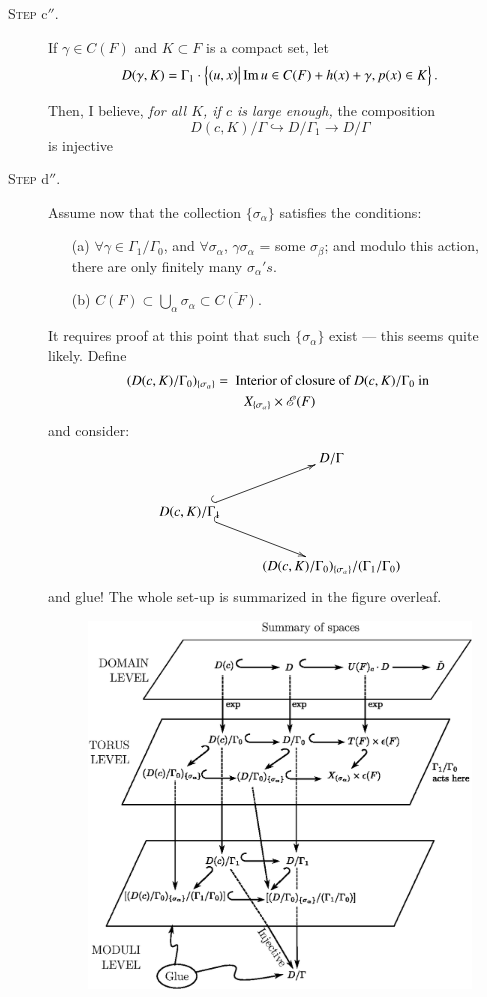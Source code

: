\begin{description}
\item[\textsc{Step} c$''$.] If $\gamma \in C(F)$ and $K \subset F$ is a compact set, let
$$
D (\gamma, K) = \Gamma_1 \cdot \left\{ (u, x) \big| \operatorname{Im}  u \in C (F) + h(x) + \gamma, p(x) \in K\right\}.
$$

Then, I believe, \textit{ for all $K$, if $c$ is large enough, } the composition
$$
D(c,K) / \Gamma \hookrightarrow D / \Gamma_1 \to D / \Gamma
$$ 
is injective

\item[\textsc{Step} d$''$.] Assume now that the collection $\{\sigma_\alpha\}$ satisfies the conditions:
\begin{itemize}
\item[(a)] $\forall \gamma \in \Gamma_1 / \Gamma_0$, and $\forall \sigma_\alpha$, $\gamma \sigma_\alpha$ = some $\sigma_\beta$; and modulo this action, there are only finitely many $\sigma_\alpha's$.

\item[(b)] $C(F) \subset \bigcup\limits_\alpha \sigma_\alpha \subset \overline{C(F)}$.
\end{itemize}

It requires proof at this point that such $\{\sigma_\alpha\}$ exist --- this seems quite likely. Define
\begin{gather*}
(D(c, K)/\Gamma_0)_{\{\sigma_\alpha\}} = \text{ Interior of closure of } D (c, K)/ \Gamma_0 \text{ in }\\
X_{\{\sigma_\alpha\}} \times \mathscr{E} (F)
\end{gather*}
and consider:
$$
\xymatrix{
& D/\Gamma\\
D(c, K)/\Gamma_1 \ar@{^{(}->}[ur] \ar@{^{(}->}[dr] & \\
& (D(c,K)/\Gamma_0)_{\{\sigma_\alpha\}} / (\Gamma_1/ \Gamma_0)
}
$$
and glue! The whole set-up is summarized in the figure overleaf.
\begin{figure}[H]
\centering
\includegraphics[scale=0.8]{220.eps}
\end{figure}


\end{description}
